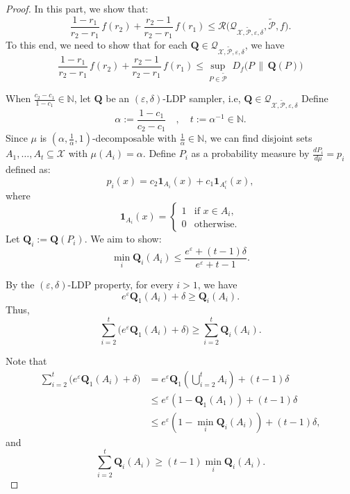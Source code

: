 \documentclass[accepted]{article}
\theoremstyle{plain} %
\theoremstyle{definition}
\theoremstyle{remark}
\newcommand{\bQ}{\mathbf{Q}}
\begin{document}
\begin{proof}
    In this part, we show that:
    \[\frac{1 - r_1}{r_2 - r_1} \, f(r_2) + \frac{r_2 - 1}{r_2 - r_1} \, f(r_1) \leq \mathcal{R}\big(\mathcal{Q}_{\mathcal{X}, \tilde{\mathcal{P}}, \varepsilon, \delta}, \tilde{\mathcal{P}}, f\big).\]
     To this end, we need to show that for each $\bQ \in \mathcal{Q}_{\mathcal{X}, \tilde{\mathcal{P}}, \varepsilon, \delta}$, we have
     \[\frac{1 - r_1}{r_2 - r_1} \, f(r_2) + \frac{r_2 - 1}{r_2 - r_1} \, f(r_1) \le \sup_{P \in \tilde{\mathcal{P}}} 
        \;D_f\big(P \, \| \, \bQ(P)\big)\]
       
When $\frac{c_2 - c_1}{1 - c_1} \in \mathbb{N}$, let $\bQ$ be an $(\varepsilon, \delta)$-LDP sampler, i.e, $\bQ \in \mathcal{Q}_{\mathcal{X}, \tilde{\mathcal{P}}, \varepsilon, \delta}$ Define
\[
\alpha := \frac{1 - c_1}{c_2 - c_1}
\quad ,
\quad t := \alpha^{-1} \in \mathbb{N}.
\]
Since $\mu$ is $(\alpha,\frac{1}{\alpha},1)$-decomposable with $\frac{1}{\alpha} \in \mathbb{N}$, we can find disjoint sets $A_1, \ldots, A_t \subseteq \mathcal{X}$ with $\mu(A_i) = \alpha$. Define $P_i$ as a probability measure by $\frac{dP_i}{d\mu} = p_i$ defined as:
\[
p_i(x) = c_2 \mathbf{1}_{A_i}(x) + c_1 \mathbf{1}_{A_i^c}(x),
\]
where \[
\mathbf{1}_{A_i}(x) =
\begin{cases}
1 & \text{if } x \in A_i, \\
0 & \text{otherwise}.
\end{cases}
\]
Let $\bQ_i := \bQ(P_i)$. We aim to show:
\[
\min_i \bQ_i(A_i) \leq \frac{e^\varepsilon + (t-1)\delta}{e^\varepsilon + t - 1}.
\]

By the $(\varepsilon, \delta)$-LDP property, for every $i > 1$, we have
\[
e^\varepsilon \bQ_1(A_i) + \delta \geq \bQ_i(A_i).
\]
Thus,
\begin{equation*}
    \sum_{i=2}^t \Big( e^\varepsilon \bQ_1(A_i) + \delta \Big) \geq \sum_{i=2}^t \bQ_i(A_i).
\end{equation*}



Note that
\begin{align*}
    \sum_{i=2}^t \Big( e^\varepsilon \bQ_1(A_i) + \delta\Big)
& = e^\varepsilon \bQ_1\left(\bigcup_{i=2}^t A_i\right) + (t-1)\delta \\ &
\leq e^\varepsilon \left(1 - \bQ_1(A_1)\right) + (t-1)\delta
\\ & \leq e^\varepsilon \left(1 - \min_i \bQ_i(A_i)\right) + (t-1)\delta,
\end{align*}
and
\begin{equation*}
    \sum_{i=2}^t \bQ_i(A_i) \geq (t-1) \min_i \bQ_i(A_i).
\end{equation*}



\end{proof}
\end{document}
